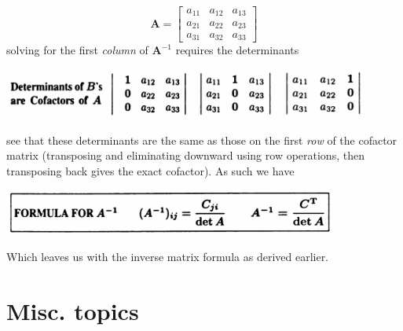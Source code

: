 \documentclass{report}
\begin{document}
\begin{equation*}
\bm A=\left[\begin{array}{ccc}
a_{11}&a_{12}&a_{13}\\
a_{21}&a_{22}&a_{23}\\
a_{31}&a_{32}&a_{33}
\end{array}\right]
\end{equation*}
solving for the first \textit{column} of $\bm A^{-1}$ requires the determinants
\begin{center}
\includegraphics[width=12cm]{108}
\end{center}
see that these determinants are the same as those on the first \textit{row} of the cofactor matrix 
(transposing and eliminating downward using row operations, then transposing back gives the exact cofactor). As such we have
\begin{center}
\includegraphics[width=11cm]{109}
\end{center}
Which leaves us with the inverse matrix formula as derived earlier.
\newpage

\section{}





\newpage



\appendix
\chapter{Misc. topics}
\end{document}
